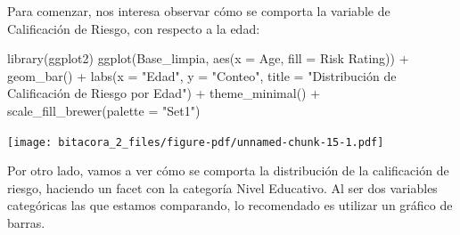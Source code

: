 \documentclass[
  letterpaper,
  DIV=11,
  numbers=noendperiod]{scrreprt}
\newenvironment{Shaded}{\begin{snugshade}}{\end{snugshade}}
\newcommand{\AttributeTok}[1]{\textcolor[rgb]{0.40,0.45,0.13}{#1}}
\newcommand{\FunctionTok}[1]{\textcolor[rgb]{0.28,0.35,0.67}{#1}}
\newcommand{\NormalTok}[1]{\textcolor[rgb]{0.00,0.23,0.31}{#1}}
\newcommand{\SpecialCharTok}[1]{\textcolor[rgb]{0.37,0.37,0.37}{#1}}
\newcommand{\StringTok}[1]{\textcolor[rgb]{0.13,0.47,0.30}{#1}}
\begin{document}
Para comenzar, nos interesa observar cómo se comporta la variable de
Calificación de Riesgo, con respecto a la edad:

\begin{Shaded}
\begin{Highlighting}[]
\FunctionTok{library}\NormalTok{(ggplot2)}
\FunctionTok{ggplot}\NormalTok{(Base\_limpia, }\FunctionTok{aes}\NormalTok{(}\AttributeTok{x =}\NormalTok{ Age, }\AttributeTok{fill =} \StringTok{\textasciigrave{}}\AttributeTok{Risk Rating}\StringTok{\textasciigrave{}}\NormalTok{)) }\SpecialCharTok{+}
  \FunctionTok{geom\_bar}\NormalTok{() }\SpecialCharTok{+}  
  \FunctionTok{labs}\NormalTok{(}\AttributeTok{x =} \StringTok{"Edad"}\NormalTok{, }\AttributeTok{y =} \StringTok{"Conteo"}\NormalTok{, }\AttributeTok{title =} \StringTok{"Distribución de Calificación de Riesgo por Edad"}\NormalTok{) }\SpecialCharTok{+} 
  \FunctionTok{theme\_minimal}\NormalTok{() }\SpecialCharTok{+}  
  \FunctionTok{scale\_fill\_brewer}\NormalTok{(}\AttributeTok{palette =} \StringTok{"Set1"}\NormalTok{)  }
\end{Highlighting}
\end{Shaded}

\texttt{[image: bitacora\_2\_files/figure-pdf/unnamed-chunk-15-1.pdf]}

Por otro lado, vamos a ver cómo se comporta la distribución de la
calificación de riesgo, haciendo un facet con la categoría Nivel
Educativo. Al ser dos variables categóricas las que estamos comparando,
lo recomendado es utilizar un gráfico de barras.
\end{document}
